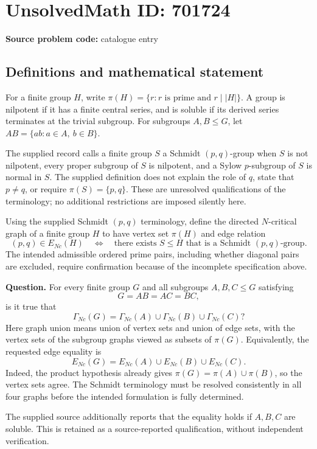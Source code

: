 \documentclass[11pt]{article}
\begin{document}
\section*{UnsolvedMath ID: 701724}
\textbf{Source problem code:} catalogue entry
\subsection{Definitions and mathematical statement}
For a finite group \(H\), write \(\pi(H)=\{r:r\text{ is prime and }r\mid |H|\}\). A group is nilpotent if it has a finite central series, and is soluble if its derived series terminates at the trivial subgroup. For subgroups \(A,B\leq G\), let \(AB=\{ab:a\in A,\ b\in B\}\).

The supplied record calls a finite group \(S\) a Schmidt \((p,q)\)-group when \(S\) is not nilpotent, every proper subgroup of \(S\) is nilpotent, and a Sylow \(p\)-subgroup of \(S\) is normal in \(S\). The supplied definition does not explain the role of \(q\), state that \(p\ne q\), or require \(\pi(S)=\{p,q\}\). These are unresolved qualifications of the terminology; no additional restrictions are imposed silently here.

Using the supplied Schmidt \((p,q)\) terminology, define the directed \(N\)-critical graph of a finite group \(H\) to have vertex set \(\pi(H)\) and edge relation
\[
(p,q)\in E_{Nc}(H)
\quad\Longleftrightarrow\quad
\text{there exists }S\leq H\text{ that is a Schmidt }(p,q)\text{-group}.
\]
The intended admissible ordered prime pairs, including whether diagonal pairs are excluded, require confirmation because of the incomplete specification above.

\textbf{Question.} For every finite group \(G\) and all subgroups \(A,B,C\leq G\) satisfying
\[
G=AB=AC=BC,
\]
is it true that
\[
\Gamma_{Nc}(G)=\Gamma_{Nc}(A)\cup\Gamma_{Nc}(B)\cup\Gamma_{Nc}(C)?
\]
Here graph union means union of vertex sets and union of edge sets, with the vertex sets of the subgroup graphs viewed as subsets of \(\pi(G)\). Equivalently, the requested edge equality is
\[
E_{Nc}(G)=E_{Nc}(A)\cup E_{Nc}(B)\cup E_{Nc}(C).
\]
Indeed, the product hypothesis already gives \(\pi(G)=\pi(A)\cup\pi(B)\), so the vertex sets agree. The Schmidt terminology must be resolved consistently in all four graphs before the intended formulation is fully determined.

The supplied source additionally reports that the equality holds if \(A,B,C\) are soluble. This is retained as a source-reported qualification, without independent verification.
\end{document}
